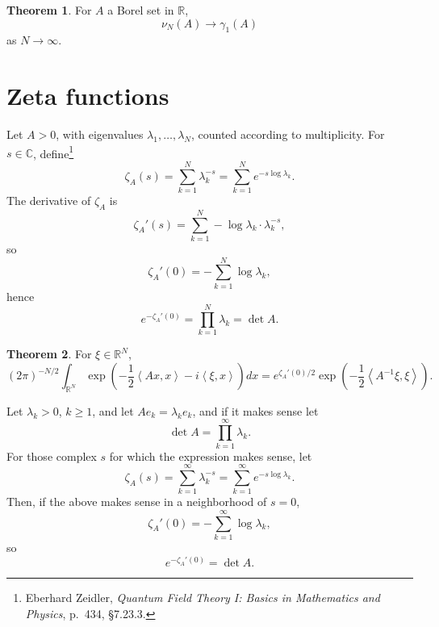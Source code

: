 \documentclass{article}
\newcommand{\inner}[2]{\left\langle #1, #2 \right\rangle}
\theoremstyle{definition}
\newtheorem{theorem}{Theorem}
\theoremstyle{definition}
\begin{document}
\begin{theorem}
For $A$ a Borel set in $\mathbb{R}$,
\[
\nu_N(A) \to \gamma_1(A)
\]
as $N \to \infty$. 
\end{theorem}






\section{Zeta functions}
Let $A>0$, with eigenvalues
 $\lambda_1,
\ldots,\lambda_N$, counted according to multiplicity.
For $s \in \mathbb{C}$, define\footnote{Eberhard Zeidler,
{\em Quantum Field Theory I: Basics in Mathematics and Physics},
p.~434, \S 7.23.3.}
\[
\zeta_A(s) = \sum_{k=1}^N \lambda_k^{-s} = \sum_{k=1}^N e^{-s \log \lambda_k}.
\]
The derivative of $\zeta_A$ is
\[
\zeta_A'(s) = \sum_{k=1}^N -\log \lambda_k \cdot \lambda_k^{-s},
\]
so
\[
\zeta_A'(0) = - \sum_{k=1}^N \log \lambda_k,
\]
hence
\[
e^{-\zeta_A'(0)} = \prod_{k=1}^N \lambda_k = \det A.
\]

\begin{theorem}
For $\xi \in \mathbb{R}^N$,
\[
(2\pi)^{-N/2} \int_{\mathbb{R}^N}  \exp\left(-\frac{1}{2} \inner{Ax}{x} - i\inner{\xi}{x} \right) dx
=e^{\zeta_A'(0)/2}  \exp\left( -\frac{1}{2} \inner{A^{-1} \xi}{\xi} \right).
\]
\end{theorem}

Let $\lambda_k>0$, $k \geq 1$, and
let $Ae_k = \lambda_k e_k$, and if it makes sense let
\[
\det A = \prod_{k=1}^\infty \lambda_k.
\]
For those complex $s$ for which the expression makes sense,
let
\[
\zeta_A(s) = \sum_{k=1}^\infty \lambda_k^{-s} = \sum_{k=1}^\infty e^{-s \log \lambda_k}.
\]
Then, if the above makes sense in a neighborhood of $s=0$,
\[
\zeta_A'(0) =  - \sum_{k=1}^\infty \log \lambda_k,
\]
so
\[
e^{-\zeta_A'(0)} = \det A.
\]
\end{document}
